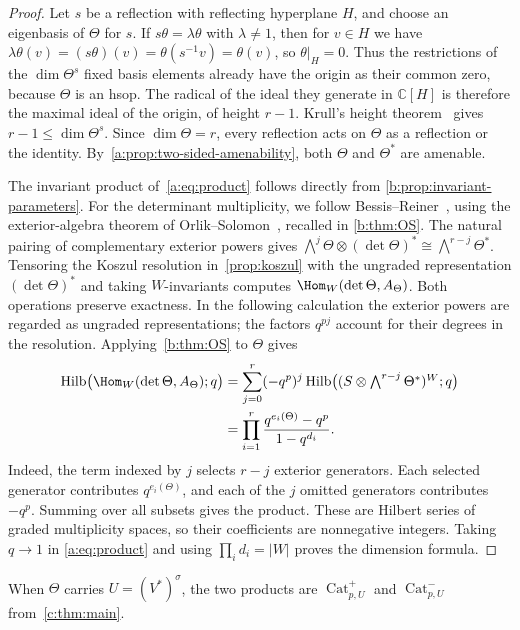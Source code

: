 \documentclass[11pt]{amsart}
\DeclareMathOperator{\Cat}{Cat}
\theoremstyle{definition}
\newcommand{\C}{\mathbb C}\newcommand{\Q}{\mathbb Q}
\DeclareMathOperator{\Hilb}{Hilb}\DeclareMathOperator{\Res}{Res}
\begin{document}
\begin{proof}
Let $s$ be a reflection with reflecting hyperplane $H$, and choose
an eigenbasis of $\Theta$ for $s$. If $s\theta=\lambda\theta$
with $\lambda\ne1$, then for $v\in H$ we have
$\lambda\theta(v)=(s\theta)(v)=\theta(s^{-1}v)=\theta(v)$,
so $\theta|_H=0$. Thus the restrictions of the $\dim\Theta^s$ fixed
basis elements already have the origin as
their common zero, because $\Theta$ is an hsop. The radical of the
ideal they generate in $\C[H]$ is therefore the maximal ideal of the
origin, of height $r-1$. Krull's height
theorem~\cite[Lemma~10.60.12(1)]{Stacks} gives
$r-1\leq\dim\Theta^s$.
Since $\dim\Theta=r$, every reflection acts on $\Theta$ as a
reflection or the identity. By~\cref{a:prop:two-sided-amenability},
both $\Theta$ and $\Theta^*$ are amenable.

The invariant product of~\cref{a:eq:product} follows directly from
\cref{b:prop:invariant-parameters}.
For the determinant multiplicity, we follow
Bessis--Reiner~\cite[Proposition~4.2]{BR}, using the exterior-algebra
theorem of Orlik--Solomon~\cite[Theorem~3.1]{OS}, recalled in
\cref{b:thm:OS}.
The natural pairing of complementary exterior powers gives
$\bigwedge^j\Theta\otimes(\det\Theta)^*
\cong\bigwedge^{r-j}\Theta^*$.
Tensoring the Koszul resolution in~\cref{prop:koszul} with the ungraded
representation $(\det\Theta)^*$ and taking $W$-invariants computes
$\Hom_W(\det\Theta,A_\Theta)$. Both operations preserve exactness.
In the following calculation the exterior powers are regarded as
ungraded representations; the factors $q^{pj}$ account for their
degrees in the resolution. Applying~\cref{b:thm:OS} to $\Theta$ gives
\begin{align*}
 \Hilb\bigl(\Hom_W(\det\Theta,A_\Theta);q\bigr)
 &=\sum_{j=0}^r(-q^p)^j
   \Hilb\bigl((S\otimes\textstyle\bigwedge^{r-j}\Theta^*)^W;q\bigr)\\
 &=\prod_{i=1}^r\frac{q^{e_i(\Theta)}-q^p}{1-q^{d_i}}.
\end{align*}
Indeed, the term indexed by $j$ selects $r-j$ exterior generators.
Each selected generator contributes $q^{e_i(\Theta)}$, and each of
the $j$ omitted generators contributes $-q^p$. Summing over all
subsets gives the product.
These are Hilbert series of graded multiplicity spaces, so their
coefficients are nonnegative integers. Taking $q\to1$ in
\cref{a:eq:product} and using $\prod_i d_i=|W|$ proves the dimension
formula.
\end{proof}

When $\Theta$ carries $U=(V^*)^\sigma$, the two products are
$\Cat^+_{p,U}$ and $\Cat^-_{p,U}$ from~\cref{c:thm:main}.
\end{document}
